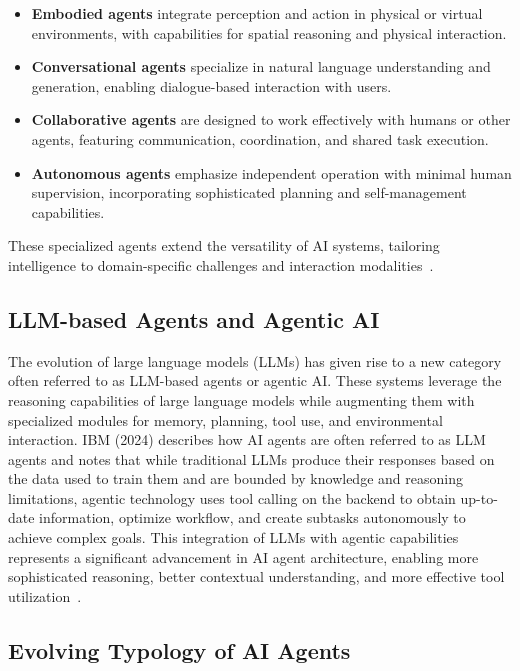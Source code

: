 \begin{itemize}
    \item \textbf{Embodied agents} integrate perception and action in physical or virtual environments, with capabilities for spatial reasoning and physical interaction.
    \item \textbf{Conversational agents} specialize in natural language understanding and generation, enabling dialogue-based interaction with users.
    \item \textbf{Collaborative agents} are designed to work effectively with humans or other agents, featuring communication, coordination, and shared task execution.
    \item \textbf{Autonomous agents} emphasize independent operation with minimal human supervision, incorporating sophisticated planning and self-management capabilities.
\end{itemize}

These specialized agents extend the versatility of AI systems, tailoring intelligence to domain-specific challenges and interaction modalities~\cite{AWS2024}.


\subsection{LLM-based Agents and Agentic AI}

The evolution of large language models (LLMs) has given rise to a new category often referred to as LLM-based agents or agentic AI. These systems leverage the reasoning capabilities of large language models while augmenting them with specialized modules for memory, planning, tool use, and environmental interaction. IBM (2024) describes how AI agents are often referred to as LLM agents and notes that while traditional LLMs produce their responses based on the data used to train them and are bounded by knowledge and reasoning limitations, agentic technology uses tool calling on the backend to obtain up-to-date information, optimize workflow, and create subtasks autonomously to achieve complex goals. This integration of LLMs with agentic capabilities represents a significant advancement in AI agent architecture, enabling more sophisticated reasoning, better contextual understanding, and more effective tool utilization~\cite{IBM2024}.


\subsection{Evolving Typology of AI Agents}

